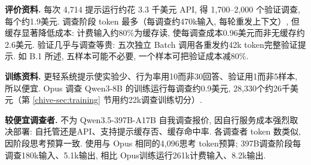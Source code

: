 \textbf{评价资料.} 每次 4,714 提示运行约花 3.3 千美元 API, 得 1,700--2,000 个验证调查, 每个约1.9美元. 调查阶段 token 最多（每调查约470k输入, 每轮重发上下文）, 但缓存显著降低成本: 计费输入约80\%为缓存读, 使每调查成本0.96美元而非无缓存约2.6美元. 验证几乎与调查等贵: 五次独立 Batch 调用各重发约42k token完整验证提示. 如 B.1 所述, 五样本可能不必要, 一个样本可把验证成本减80\%.

\textbf{训练资料.} 更轻系统提示使实验少、行为率用10而非30回答、验证用1而非5样本, 所以便宜. Opus 调查 Qwen3-8B 的训练运行每调查约0.9美元, 28,330个约26千美元（第 \ref{chive-sec:training} 节用约22k调查训练切分）.

\textbf{较便宜调查者.} 不为 Qwen3.5-397B-A17B 自我调查报价, 因自行服务成本强烈取决部署: 自托管还是API、支持提示缓存否、缓存命中率. 各调查者 token 数类似, 因阶段思考预算一致. 使用与 Opus 相同的4,096思考 token预算; 397B调查阶段每调查180k输入、5.1k输出, 相比 Opus训练运行261k计费输入、8.2k输出.

